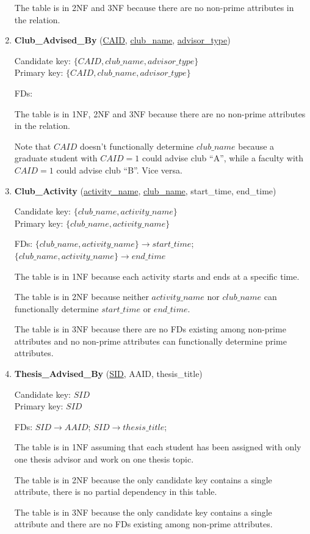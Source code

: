 \documentclass[10pt]{article}
\begin{document}
\begin{enumerate}
  The table is in 2NF and 3NF because there are no non-prime
  attributes in the relation.

\item \textbf{Club\_Advised\_By} (\underline{CAID},
  \underline{club\_name}, \underline{advisor\_type})

  Candidate key: $\{CAID, club\_name, advisor\_type\}$\\
  Primary key: $\{CAID, club\_name, advisor\_type\}$

  FDs: 

  The table is in 1NF, 2NF and 3NF because there are no non-prime
  attributes in the relation.

  Note that $CAID$ doesn't functionally determine $club\_name$ because
  a graduate student with $CAID=1$ could advise club ``A'', while a
  faculty with $CAID=1$ could advise club ``B''. Vice versa.

\item \textbf{Club\_Activity} (\underline{activity\_name},
  \underline{club\_name}, start\_time, end\_time)

  Candidate key: $\{club\_name, activity\_name\}$\\
  Primary key: $\{club\_name, activity\_name\}$

  FDs: $\{club\_name, activity\_name\} \rightarrow start\_time$;
  $\{club\_name, activity\_name\} \rightarrow end\_time$

  The table is in 1NF because each activity starts and ends at a
  specific time.

  The table is in 2NF because neither $activity\_name$ nor
  $club\_name$ can functionally determine $start\_time$ or
  $end\_time$.

  The table is in 3NF because there are no FDs existing among
  non-prime attributes and no non-prime attributes can functionally
  determine prime attributes.

\item \textbf{Thesis\_Advised\_By} (\underline{SID}, AAID,
  thesis\_title)

  Candidate key: $SID$\\
  Primary key: $SID$

  FDs: $SID \rightarrow AAID$; $SID \rightarrow thesis\_title$;

  The table is in 1NF assuming that each student has been assigned
  with only one thesis advisor and work on one thesis topic.

  The table is in 2NF because the only candidate key contains a single
  attribute, there is no partial dependency in this table.

  The table is in 3NF because the only candidate key contains a single
  attribute and there are no FDs existing among non-prime attributes.

\end{enumerate}

\vspace{1em}
\end{document}
